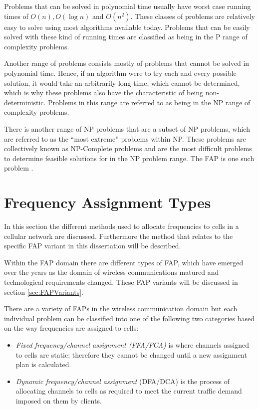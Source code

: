 Problems that can be solved in polynomial time usually have worst case running times of $O(n),O(\log n)$ and $O(n^2)$. These classes of problems are relatively easy to solve using most algorithms available today. Problems that can be easily solved with these kind of running times are classified as being in the P range of complexity problems\cite{AIModernApproach}.

Another range of problems consists mostly of problems that cannot be solved in polynomial time. Hence, if an algorithm were to try each and every possible solution, it would take an arbitrarily long time, which cannot be determined, which is why these problems also have the characteristic of being non-deterministic. Problems in this range are referred to as being in the NP range of complexity problems\cite{AIModernApproach}.

There is another range of NP problems that are a subset of NP problems, which are referred to as the ``most extreme'' problems within NP.  These problems are collectively known as NP-Complete problems and are the most difficult problems to determine feasible solutions for in the NP problem range\cite{AIModernApproach}. The FAP is one such problem \cite{MontemanniThesis,Eisenblatter,Karen2004,AndreasPaper,FixedFAPPSO}.

\section{Frequency Assignment Types}
\label{sec:FreqAssignmentTypes}
In this section the different methods used to allocate frequencies to cells in a cellular network are discussed. Furthermore the method that relates to the specific FAP variant in this dissertation will be described.

Within the FAP domain there are different types of FAP, which have emerged over the years as the domain of wireless communications matured and technological requirements changed. These FAP variants will be discussed in section \ref{sec:FAPVariants}.

There are a variety of FAPs in the wireless communication domain but each individual problem can be classified into one of the following two categories based on the way frequencies are assigned to cells:
\begin{itemize}
\item \emph{Fixed frequency/channel assignment (FFA/FCA)} is where channels assigned to cells are static; therefore they cannot be changed until a new assignment plan is calculated.
\item \emph{Dynamic frequency/channel assignment} (DFA/DCA) is the process of allocating channels to cells as required to meet the current traffic demand imposed on them by clients. 
\end{itemize}

